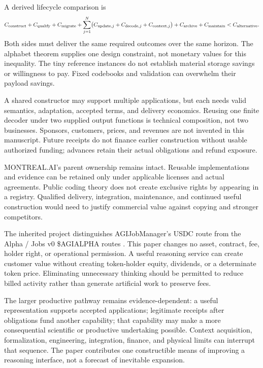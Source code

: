 \documentclass[11pt,letterpaper]{article}
\theoremstyle{remark}\newtheorem{remark}{Remark}[section]
\begin{document}
A derived lifecycle comparison is
\begin{equation}
 C_{\rm construct}+C_{\rm qualify}+C_{\rm migrate}
 +\sum_{j=1}^{N}\bigl(C_{{\rm update},j}+C_{{\rm decode},j}+C_{{\rm context},j}\bigr)
 +C_{\rm archive}+C_{\rm maintain}<C_{\rm alternative}.\label{eq:economy}
\end{equation}
Both sides must deliver the same required outcomes over the same horizon. The alphabet theorem supplies one design constraint, not monetary values for this inequality. The tiny reference instances do not establish material storage savings or willingness to pay. Fixed codebooks and validation can overwhelm their payload savings.

A shared constructor may support multiple applications, but each needs valid semantics, adaptation, accepted terms, and delivery economics. Reusing one finite decoder under two supplied output functions is technical composition, not two businesses. Sponsors, customers, prices, and revenues are not invented in this manuscript. Future receipts do not finance earlier construction without usable authorized funding; advances retain their actual obligations and refund exposure.

MONTREAL.AI's parent ownership remains intact. Reusable implementations and evidence can be retained only under applicable licenses and actual agreements. Public coding theory does not create exclusive rights by appearing in a registry. Qualified delivery, integration, maintenance, and continued useful construction would need to justify commercial value against copying and stronger competitors.

The inherited project distinguishes AGIJobManager's USDC route from the Alpha / Jobs v0 \$AGIALPHA routes \citep{boucherEconomy,boucherExecute}. This paper changes no asset, contract, fee, holder right, or operational permission. A useful reasoning service can create customer value without creating token-holder equity, dividends, or a determinate token price. Eliminating unnecessary thinking should be permitted to reduce billed activity rather than generate artificial work to preserve fees.

The larger productive pathway remains evidence-dependent: a useful representation supports accepted applications; legitimate receipts after obligations fund another capability; that capability may make a more consequential scientific or productive undertaking possible. Context acquisition, formalization, engineering, integration, finance, and physical limits can interrupt that sequence. The paper contributes one constructible means of improving a reasoning interface, not a forecast of inevitable expansion.
\end{document}

